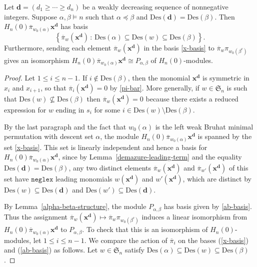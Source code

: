 \documentclass[ALCO,ThmDefs,published]{cedram}
\newcommand{\symm}{{\mathfrak{S}}}
\newcommand{\xx}{{\mathbf {x}}}
\theoremstyle{plain}
\newcommand{\Des}{{\mathrm {Des}}}
\newcommand{\neglex}{{\mathtt {neglex}}}
\newcommand{\symm}{{\mathfrak{S}}}
\newcommand{\xx}{{\mathbf {x}}}
\newcommand{\dd}{{\mathbf {d}}}
\newcommand{\pib}{\overline{\pi}}
\begin{document}
\begin{lemma}
\label{alpha-beta-monomial}
Let $\dd = (d_1 \geq \cdots \geq d_n)$ be a weakly decreasing sequence of nonnegative integers.
Suppose $\alpha,\beta \models n$ such that $\alpha\preceq\beta$ and $\Des(\dd) = \Des(\beta)$.
Then $H_n(0) \pib_{w_0(\alpha)} \xx^{\dd}$ has basis
\begin{equation}
\label{x-basis}
\left\{ \pib_w(\xx^{\dd}) \,:\, \Des(\alpha) \subseteq \Des(w) \subseteq \Des(\beta) \right\}.
\end{equation}
Furthermore, sending each element $\pib_w(\xx^\dd)$ in the basis \eqref{x-basis} to $\pib_w\pi_{w_0(\beta^c)}$ gives an isomorphism $H_n(0) \pib_{w_0(\alpha)} \xx^{\dd} \cong P_{\alpha,\beta}$ of $H_n(0)$-modules.
\end{lemma}

\begin{proof}
Let $1 \leq i \leq n-1$.  If $i \notin \Des(\beta)$, then the monomial $\xx^{\dd}$ is symmetric in $x_i$ and $x_{i+1}$,
so that $\pib_i(\xx^{\dd}) = 0$ by \eqref{pi-bar}.  
More generally, if $w \in \symm_n$ is such that $\Des(w) \not\subseteq \Des(\beta)$ then $\pib_w(\xx^{\dd}) = 0$ because there exists a reduced expression for $w$ ending in $s_i$ for some $i\in\Des(w)\setminus\Des(\beta)$.

By the last paragraph and the fact that $w_0(\alpha)$ is the left weak
Bruhat minimal permutation with descent set $\alpha$,
the module $H_n(0) \pib_{w_0(\alpha)} \xx^{\dd}$ is spanned by the set \eqref{x-basis}.
This set is linearly independent and hence a basis for $H_n(0) \pib_{w_0(\alpha)} \xx^{\dd}$, since by Lemma~\ref{demazure-leading-term} and the equality $\Des(\dd) = \Des(\beta)$, any two distinct elements $\pib_w(\xx^{\dd})$ and $\pib_{w'}(\xx^{\dd})$ of this set have $\neglex$ leading monomials $w(\xx^\dd)$ and $w'(\xx^\dd)$, which are distinct by $\Des(w)\subseteq \Des(\dd)$ and $\Des(w')\subseteq \Des(\dd)$.

By Lemma~\ref{alpha-beta-structure}, the module
$P_{\alpha,\beta}$ has basis given by \eqref{ab-basis}.
Thus the assignment $\pib_w(\xx^{\dd}) \mapsto \pib_w \pi_{w_0(\beta^c)}$ induces a linear isomorphism
from $H_n(0) \pib_{w_0(\alpha)} \xx^{\dd}$  to $P_{\alpha,\beta}$.  To check that this is an isomorphism of 
$H_n(0)$-modules, let $1 \leq i \leq n-1$.  We compare the action of $\pib_i$ on the bases 
(\ref{x-basis}) and (\ref{ab-basis}) as follows.  Let $w \in \symm_n$ satisfy 
$\Des(\alpha) \subseteq \Des(w) \subseteq \Des(\beta)$.


\end{proof}
\end{document}
